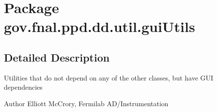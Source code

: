 \hypertarget{namespacegov_1_1fnal_1_1ppd_1_1dd_1_1util_1_1guiUtils}{\section{Package gov.\-fnal.\-ppd.\-dd.\-util.\-gui\-Utils}
\label{namespacegov_1_1fnal_1_1ppd_1_1dd_1_1util_1_1guiUtils}
}


\subsection{Detailed Description}
Utilities that do not depend on any of the other classes, but have G\-U\-I dependencies

\begin{DoxyAuthor}{Author}
Elliott Mc\-Crory, Fermilab A\-D/\-Instrumentation 
\end{DoxyAuthor}
